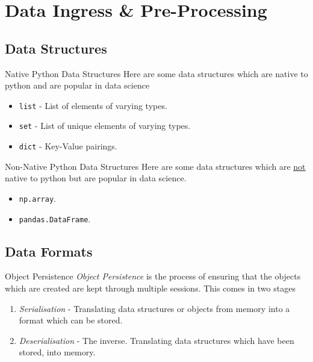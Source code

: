 \documentclass[11pt,a4paper]{article}
\begin{document}
\section{Data Ingress \& Pre-Processing}\label{sec_data_ingress}

\subsection{Data Structures}\label{sec_data_structures}

  \begin{proposition}{Native Python Data Structures}
    Here are some data structures which are native to python and are popular in data science
    \begin{itemize}
      \item \texttt{list} - List of elements of varying types.
      \item \texttt{set} - List of unique elements of varying types.
      \item \texttt{dict} - Key-Value pairings.
    \end{itemize}
  \end{proposition}

  \begin{proposition}{Non-Native Python Data Structures}
    Here are some data structures which are \underline{not} native to python but are popular in data science.
    \begin{itemize}
      \item \texttt{np.array}.
      \item \texttt{pandas.DataFrame}.
    \end{itemize}
  \end{proposition}

\subsection{Data Formats}\label{sec_data_formats}

  \begin{definition}{Object Persistence}
    \textit{Object Persistence} is the process of ensuring that the objects which are created are kept through multiple sessions. This comes in two stages
    \begin{enumerate}
      \item \textit{Serialisation} - Translating data structures or objects from memory into a format which can be stored.
      \item \textit{Deserialisation} - The inverse. Translating data structures which have been stored, into memory.
    \end{enumerate}
  \end{definition}
\end{document}
